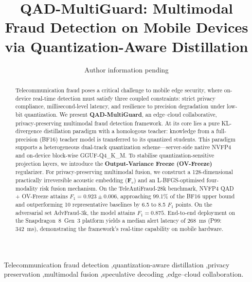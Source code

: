 \documentclass[final,5p,times,number]{elsarticle}
\begin{document}
\begin{frontmatter}

\title{QAD-MultiGuard: Multimodal Fraud Detection on Mobile Devices via Quantization-Aware Distillation}

\author{Author information pending}


\begin{abstract}
Telecommunication fraud poses a critical challenge to mobile edge security, where on-device real-time detection must satisfy three coupled constraints: strict privacy compliance, millisecond-level latency, and resilience to precision degradation under low-bit quantization. We present \textbf{QAD-MultiGuard}, an edge--cloud collaborative, privacy-preserving multimodal fraud detection framework. At its core lies a pure KL-divergence distillation paradigm with a homologous teacher: knowledge from a full-precision (BF16) teacher model is transferred to its quantized students. This paradigm supports a heterogeneous dual-track quantization scheme---server-side native NVFP4 and on-device block-wise GGUF-Q4\_K\_M. To stabilise quantization-sensitive projection layers, we introduce the \textbf{Output-Variance Freeze (OV-Freeze)} regularizer. For privacy-preserving multimodal fusion, we construct a 128-dimensional practically irreversible acoustic embedding ($\bm{F}_v$) and an L-BFGS-optimised four-modality risk fusion mechanism. On the TeleAntiFraud-28k benchmark, NVFP4 QAD + OV-Freeze attains $F_1 = 0.923 \pm 0.006$, approaching 99.1\% of the BF16 upper bound and outperforming 10 representative baselines by 6.5 to 8.5 $F_1$ points. On the adversarial set AdvFraud-3k, the model attains $F_1 = 0.875$. End-to-end deployment on the Snapdragon~8~Gen~3 platform yields a median alert latency of 268~ms (P99: 342~ms), demonstrating the framework's real-time capability on mobile hardware.
\end{abstract}

\begin{keyword}
Telecommunication fraud detection \sep quantization-aware distillation \sep privacy preservation \sep multimodal fusion \sep speculative decoding \sep edge--cloud collaboration.
\end{keyword}

\end{frontmatter}
\end{document}
